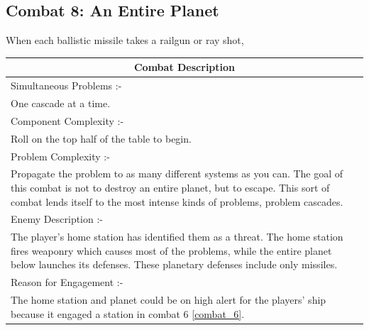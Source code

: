 \documentclass[a4paper]{article}
\begin{document}
\subsection{Combat 8: An Entire Planet} \label{combat_8}

When each ballistic missile takes a railgun or ray shot, \newline {}

\begin{minipage}[t]{0.5\linewidth}
\begin{tabular}[t]{| p{7cm} |}
\toprule
\multicolumn{1}{|c|}{Combat Description} \\
\midrule
Simultaneous Problems :- \\
One cascade at a time. \\	
\midrule
Component Complexity :- \\
Roll on the top half of the table to begin. \\
\midrule
Problem Complexity :- \\
Propagate the problem to as many different systems as you can. The goal of this combat is not to destroy an entire planet, but to escape. This sort of combat lends itself to the most intense kinds of problems, problem cascades. \\
\midrule
Enemy Description :- \\
The player's home station has identified them as a threat. The home station fires weaponry which causes most of the problems, while the entire planet below launches its defenses. These planetary defenses include only missiles. \\
\midrule
Reason for Engagement :- \\
The home station and planet could be on high alert for the players' ship because it engaged a station in combat 6 \ref{combat_6}. \\
\bottomrule
\end{tabular}
\end{minipage}
\end{document}
